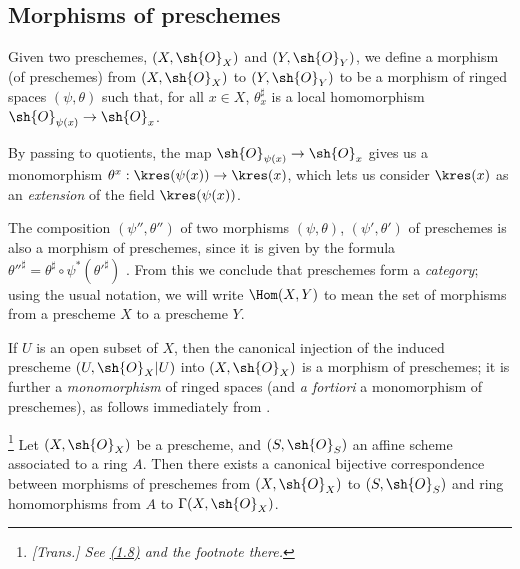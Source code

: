 \subsection{Morphisms of preschemes}
\label{subsection:I.2.2}

\begin{definition}[2.2.1]
\label{I.2.2.1}
Given two preschemes, $(X,\sh{O}_X)$ and $(Y,\sh{O}_Y)$, we define a morphism (of preschemes) from $(X,\sh{O}_X)$ to $(Y,\sh{O}_Y)$ to be a morphism of ringed spaces $(\psi,\theta)$ such that, for all $x\in X$, $\theta_x^\sharp$ is a local homomorphism $\sh{O}_{\psi(x)}\to\sh{O}_x$.
\end{definition}

By passing to quotients, the map $\sh{O}_{\psi(x)}\to\sh{O}_x$ gives us a monomorphism $\theta^x:\kres(\psi(x))\to\kres(x)$, which lets us consider $\kres(x)$ as an \emph{extension} of the field $\kres(\psi(x))$.

\begin{env}[2.2.2]
\label{I.2.2.2}
The composition $(\psi'',\theta'')$ of two morphisms $(\psi,\theta)$, $(\psi',\theta')$ of preschemes is also a morphism of preschemes, since it is given by the formula ${\theta''}^\sharp=\theta^\sharp\circ\psi^*({\theta'}^\sharp)$ .
From this we conclude that preschemes form a \emph{category};
using the usual notation, we will write $\Hom(X,Y)$ to mean the set of morphisms from a prescheme $X$ to a prescheme $Y$.
\end{env}

\begin{example}[2.2.3]
\label{I.2.2.3}
If $U$ is an open subset of $X$, then the canonical injection  of the induced prescheme $(U,\sh{O}_X|U)$ into $(X,\sh{O}_X)$ is a morphism of preschemes;
it is further a \emph{monomorphism} of ringed spaces (and \emph{a fortiori} a monomorphism of preschemes), as follows immediately from .
\end{example}

\begin{proposition}[2.2.4]
\label{I.2.2.4}
\footnote{\emph{[Trans.] See \hyperref[subsection:I.1.8]{(1.8)} and the footnote there.}}
Let $(X,\sh{O}_X)$ be a prescheme, and $(S,\sh{O}_S)$ an affine scheme associated to a ring $A$.
Then there exists a canonical bijective correspondence between morphisms of preschemes from $(X,\sh{O}_X)$ to $(S,\sh{O}_S)$ and ring homomorphisms from $A$ to $\Gamma(X,\sh{O}_X)$.
\end{proposition}

